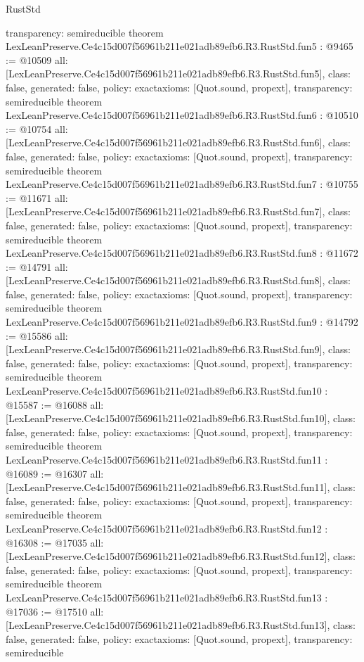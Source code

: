 \begin{lexlean}{RustStd}
\begin{coremodule}
{  transparency: semireducible
}
theorem LexLeanPreserve.Ce4c15d007f56961b211e021adb89efb6.R3.RustStd.fun5 : @9465 := @10509 {
  all: [LexLeanPreserve.Ce4c15d007f56961b211e021adb89efb6.R3.RustStd.fun5],
  class: false,
  generated: false,
  policy: exact{axioms: [Quot.sound, propext]},
  transparency: semireducible
}
theorem LexLeanPreserve.Ce4c15d007f56961b211e021adb89efb6.R3.RustStd.fun6 : @10510 := @10754 {
  all: [LexLeanPreserve.Ce4c15d007f56961b211e021adb89efb6.R3.RustStd.fun6],
  class: false,
  generated: false,
  policy: exact{axioms: [Quot.sound, propext]},
  transparency: semireducible
}
theorem LexLeanPreserve.Ce4c15d007f56961b211e021adb89efb6.R3.RustStd.fun7 : @10755 := @11671 {
  all: [LexLeanPreserve.Ce4c15d007f56961b211e021adb89efb6.R3.RustStd.fun7],
  class: false,
  generated: false,
  policy: exact{axioms: [Quot.sound, propext]},
  transparency: semireducible
}
theorem LexLeanPreserve.Ce4c15d007f56961b211e021adb89efb6.R3.RustStd.fun8 : @11672 := @14791 {
  all: [LexLeanPreserve.Ce4c15d007f56961b211e021adb89efb6.R3.RustStd.fun8],
  class: false,
  generated: false,
  policy: exact{axioms: [Quot.sound, propext]},
  transparency: semireducible
}
theorem LexLeanPreserve.Ce4c15d007f56961b211e021adb89efb6.R3.RustStd.fun9 : @14792 := @15586 {
  all: [LexLeanPreserve.Ce4c15d007f56961b211e021adb89efb6.R3.RustStd.fun9],
  class: false,
  generated: false,
  policy: exact{axioms: [Quot.sound, propext]},
  transparency: semireducible
}
theorem LexLeanPreserve.Ce4c15d007f56961b211e021adb89efb6.R3.RustStd.fun10 : @15587 := @16088 {
  all: [LexLeanPreserve.Ce4c15d007f56961b211e021adb89efb6.R3.RustStd.fun10],
  class: false,
  generated: false,
  policy: exact{axioms: [Quot.sound, propext]},
  transparency: semireducible
}
theorem LexLeanPreserve.Ce4c15d007f56961b211e021adb89efb6.R3.RustStd.fun11 : @16089 := @16307 {
  all: [LexLeanPreserve.Ce4c15d007f56961b211e021adb89efb6.R3.RustStd.fun11],
  class: false,
  generated: false,
  policy: exact{axioms: [Quot.sound, propext]},
  transparency: semireducible
}
theorem LexLeanPreserve.Ce4c15d007f56961b211e021adb89efb6.R3.RustStd.fun12 : @16308 := @17035 {
  all: [LexLeanPreserve.Ce4c15d007f56961b211e021adb89efb6.R3.RustStd.fun12],
  class: false,
  generated: false,
  policy: exact{axioms: [Quot.sound, propext]},
  transparency: semireducible
}
theorem LexLeanPreserve.Ce4c15d007f56961b211e021adb89efb6.R3.RustStd.fun13 : @17036 := @17510 {
  all: [LexLeanPreserve.Ce4c15d007f56961b211e021adb89efb6.R3.RustStd.fun13],
  class: false,
  generated: false,
  policy: exact{axioms: [Quot.sound, propext]},
  transparency: semireducible
}
\end{coremodule}
\end{lexlean}
